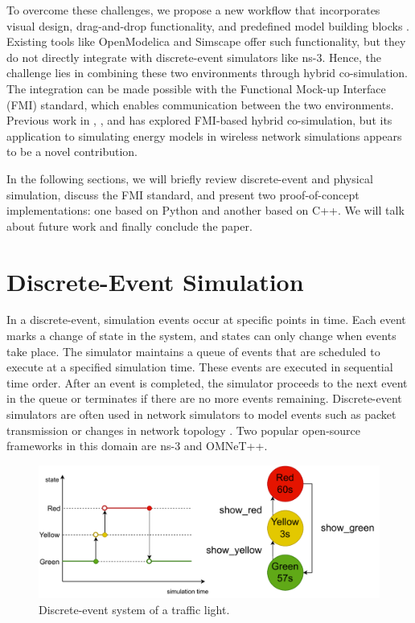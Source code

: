 \documentclass[conference]{IEEEtran}
\def\ns3{ns-3}
\begin{document}
To overcome these challenges, we propose a new workflow that incorporates visual design, drag-and-drop functionality, and predefined model building blocks \cite{carreira2020foundations}. Existing tools like OpenModelica and Simscape offer such functionality, but they do not directly integrate with discrete-event simulators like \ns3. Hence, the challenge lies in combining these two environments through hybrid co-simulation.
The integration can be made possible with the Functional Mock-up Interface (FMI) standard, which enables communication between the two environments.
Previous work in \cite{cremona2019hybrid}, \cite{cremona2016step}, and \cite{tavella2016toward} has explored FMI-based hybrid co-simulation, but its application to simulating energy models in wireless network simulations appears to be a novel contribution.

In the following sections, we will briefly review discrete-event and physical simulation, discuss the FMI standard, and present two proof-of-concept implementations: one based on Python and another based on C++. We will talk about future work and finally conclude the paper.

\section{Discrete-Event Simulation}

In a discrete-event, simulation events occur at specific points in time.
Each event marks a change of state in the system, and states can only change when events take place. 
The simulator maintains a queue of events that are scheduled to execute at a specified simulation time.
These events are executed in sequential time order.
After an event is completed, the simulator proceeds to the next event in the queue or terminates if there are no more events remaining.
Discrete-event simulators are often used in network simulators to model events such as
packet transmission or changes in network topology \cite{riley2010ns}.
Two popular open-source frameworks in this domain are \ns3 and OMNeT++.

\begin{figure}[htbp]
  \centering
  \includegraphics[width=\linewidth]{images/traffic-light.drawio.pdf}
  \caption{Discrete-event system of a traffic light.}
  \label{traffic-light}
\end{figure}
\end{document}
